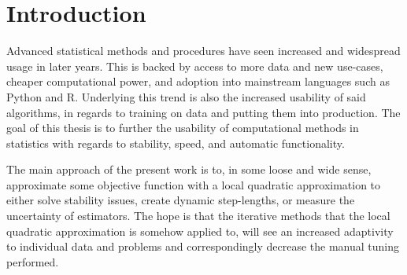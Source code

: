 \chapter{Introduction}

Advanced statistical methods and procedures have seen increased and widespread usage in later years.
This is backed by access to more data and new use-cases, cheaper computational power, and adoption into mainstream languages such as Python and R.
Underlying this trend is also the increased usability of said algorithms, in regards to training on data and putting them into production.
The goal of this thesis is to further the usability of computational methods in statistics with regards to stability, speed, and automatic functionality.

The main approach of the present work is to, in some loose and wide sense, approximate some objective function with a local quadratic approximation to either solve stability issues, create dynamic step-lengths, or measure the uncertainty of estimators.
The hope is that the iterative methods that the local quadratic approximation is somehow applied to, will see an increased adaptivity to individual data and problems and correspondingly decrease the manual tuning performed.

